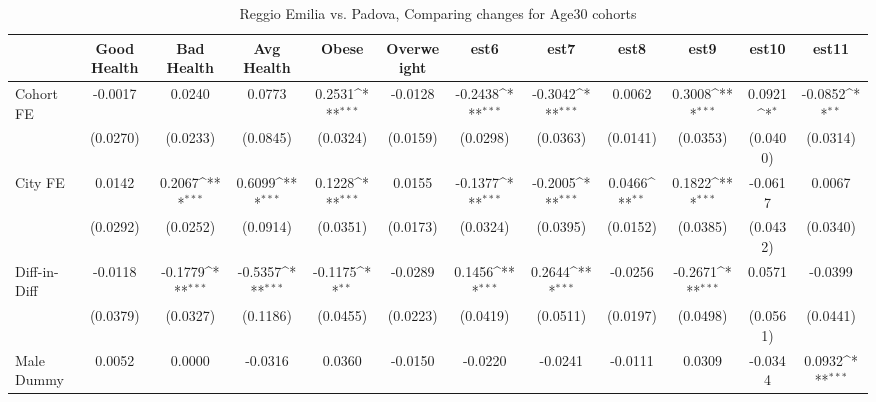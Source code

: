 \begin{table}[htbp]\centering
\def\sym#1{\ifmmode^{#1}\else\(^{#1}\)\fi}
\caption{Reggio Emilia vs. Padova, Comparing changes for Age30 cohorts}
\begin{tabular}{l*{11}{c}}
\toprule
            &\multicolumn{1}{c}{Good Health}&\multicolumn{1}{c}{Bad Health}&\multicolumn{1}{c}{Avg Health}&\multicolumn{1}{c}{Obese}&\multicolumn{1}{c}{Overweight}&\multicolumn{1}{c}{est6}&\multicolumn{1}{c}{est7}&\multicolumn{1}{c}{est8}&\multicolumn{1}{c}{est9}&\multicolumn{1}{c}{est10}&\multicolumn{1}{c}{est11}\\
\midrule
Cohort FE   &     -0.0017         &      0.0240         &      0.0773         &      0.2531\sym{***}&     -0.0128         &     -0.2438\sym{***}&     -0.3042\sym{***}&      0.0062         &      0.3008\sym{***}&      0.0921\sym{*}  &     -0.0852\sym{**} \\
            &    (0.0270)         &    (0.0233)         &    (0.0845)         &    (0.0324)         &    (0.0159)         &    (0.0298)         &    (0.0363)         &    (0.0141)         &    (0.0353)         &    (0.0400)         &    (0.0314)         \\
\addlinespace
City FE     &      0.0142         &      0.2067\sym{***}&      0.6099\sym{***}&      0.1228\sym{***}&      0.0155         &     -0.1377\sym{***}&     -0.2005\sym{***}&      0.0466\sym{**} &      0.1822\sym{***}&     -0.0617         &      0.0067         \\
            &    (0.0292)         &    (0.0252)         &    (0.0914)         &    (0.0351)         &    (0.0173)         &    (0.0324)         &    (0.0395)         &    (0.0152)         &    (0.0385)         &    (0.0432)         &    (0.0340)         \\
\addlinespace
Diff-in-Diff&     -0.0118         &     -0.1779\sym{***}&     -0.5357\sym{***}&     -0.1175\sym{**} &     -0.0289         &      0.1456\sym{***}&      0.2644\sym{***}&     -0.0256         &     -0.2671\sym{***}&      0.0571         &     -0.0399         \\
            &    (0.0379)         &    (0.0327)         &    (0.1186)         &    (0.0455)         &    (0.0223)         &    (0.0419)         &    (0.0511)         &    (0.0197)         &    (0.0498)         &    (0.0561)         &    (0.0441)         \\
\addlinespace
Male Dummy  &      0.0052         &      0.0000         &     -0.0316         &      0.0360         &     -0.0150         &     -0.0220         &     -0.0241         &     -0.0111         &      0.0309         &     -0.0344         &      0.0932\sym{***}\\

\end{tabular}
\end{table}
